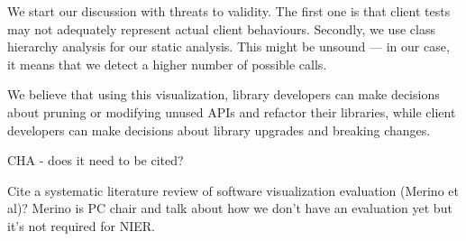 \label{sec:discussion}

We start our discussion with threats to validity. The first one is that 
client tests may not adequately represent actual client behaviours.
Secondly, we use class hierarchy analysis for our static analysis. 
This might be unsound --- in our case, it means that we detect a higher number of 
possible calls.

We believe that using this visualization, library developers can make decisions about 
pruning or modifying unused APIs and refactor their libraries, while client developers can make 
decisions about library upgrades and breaking changes.


CHA  - does it need to be cited?

Cite a systematic literature review of software visualization evaluation (Merino et al)? Merino is PC chair and talk about how we don't have an evaluation yet but it's not required for NIER.

